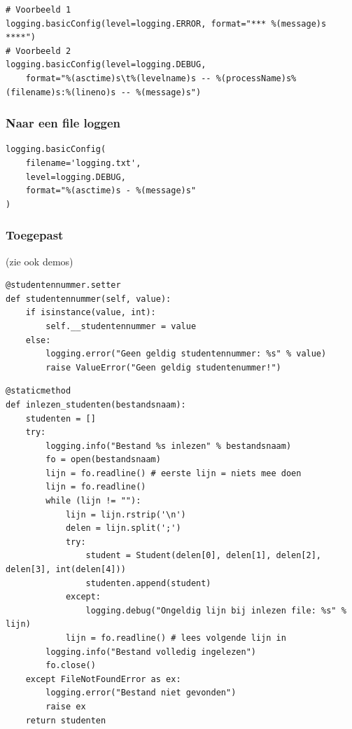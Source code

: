 \documentclass{article}
\begin{document}
\begin{verbatim}
# Voorbeeld 1
logging.basicConfig(level=logging.ERROR, format="*** %(message)s ****")
# Voorbeeld 2
logging.basicConfig(level=logging.DEBUG,
    format="%(asctime)s\t%(levelname)s -- %(processName)s%(filename)s:%(lineno)s -- %(message)s")
\end{verbatim}

\subsubsection{Naar een file loggen}

\begin{verbatim}
logging.basicConfig(
    filename='logging.txt',
    level=logging.DEBUG,
    format="%(asctime)s - %(message)s"
)
\end{verbatim}

\subsubsection{Toegepast}

(zie ook demos)

\begin{verbatim}
@studentennummer.setter
def studentennummer(self, value):
    if isinstance(value, int):
        self.__studentennummer = value
    else:
        logging.error("Geen geldig studentennummer: %s" % value)
        raise ValueError("Geen geldig studentenummer!")
\end{verbatim}

\begin{verbatim}
@staticmethod
def inlezen_studenten(bestandsnaam):
    studenten = []
    try:
        logging.info("Bestand %s inlezen" % bestandsnaam)
        fo = open(bestandsnaam)
        lijn = fo.readline() # eerste lijn = niets mee doen
        lijn = fo.readline()
        while (lijn != ""):
            lijn = lijn.rstrip('\n')
            delen = lijn.split(';')
            try:
                student = Student(delen[0], delen[1], delen[2], delen[3], int(delen[4]))
                studenten.append(student)
            except:
                logging.debug("Ongeldig lijn bij inlezen file: %s" % lijn)
            lijn = fo.readline() # lees volgende lijn in
        logging.info("Bestand volledig ingelezen")
        fo.close()
    except FileNotFoundError as ex:
        logging.error("Bestand niet gevonden")
        raise ex
    return studenten
\end{verbatim}
\end{document}
